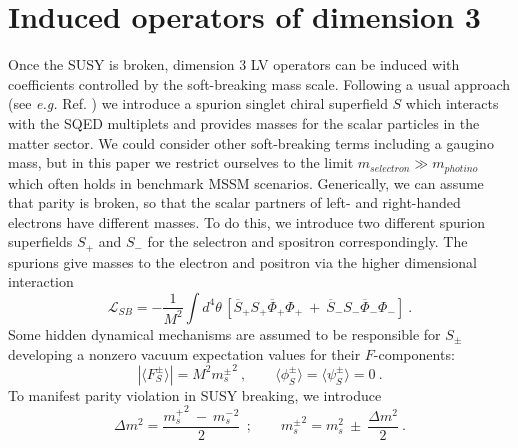 \documentclass[12pt]{revtex4}
\begin{document}
\section{Induced operators of dimension 3}
\label{InducedDim3}

Once the SUSY is broken, dimension 3 LV operators can be induced 
with coefficients controlled by the soft-breaking mass scale. 
Following a usual approach (see {\em e.g.} Ref. \cite{Wess:1992cp})
we introduce a spurion singlet
chiral superfield $ S $ which interacts with the SQED
multiplets and provides masses for the scalar particles
in the matter sector. We could consider other  
    soft-breaking terms including a gaugino mass, but in this paper we restrict
ourselves to the limit  $ m_{selectron} \gg m_{photino}$ which often holds in 
benchmark MSSM scenarios.
Generically, we can assume that parity is broken, so that
the scalar partners of left- and right-handed electrons have different masses.
To do this, we introduce two different
spurion superfields $ S_+ $ and $ S_- $
for the selectron and spositron correspondingly.
The spurions give masses to the electron and positron
via the higher dimensional interaction
\begin{equation}
\label{SB_vertex}
  \mathcal{L}_{SB} = - \frac{1}{M^2} \int d^4\theta \, 
\left[\overline{S}_+ S_+ \overline{\Phi}_+ \Phi_+ 
~+~
\overline{S}_- S_- \overline{\Phi}_- \Phi_-
\right] 
~.
\end{equation}
Some hidden dynamical mechanisms are assumed to be responsible 
    for  $ S_\pm $ developing a 
nonzero vacuum expectation values for their $ F $-components:
\[
\left | \langle F^\pm_S \rangle \right | =
M^2 {m^\pm_{s}}^2~,\qquad 
\langle\phi_S^\pm\rangle = 
\langle\psi_S^\pm\rangle = 0~.
\]
	To manifest parity violation in SUSY breaking, we introduce 
\begin{equation}
\Delta m^2 = \frac{ {m_{s}^+}^2 ~ - ~ {m_{s}^-}^2 }
  {                  2                  }~~;
\qquad
{m_{s}^\pm}^2 = m_s^2 ~\pm~ \frac{\Delta m^2}{2}~.
\label{deltam}
\end{equation}
\end{document}
